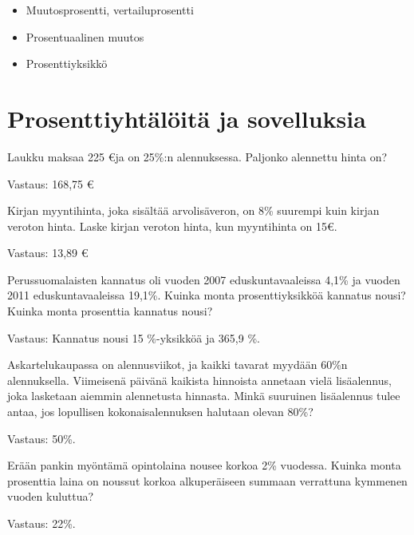 \begin{itemize}
	\item Muutosprosentti, vertailuprosentti
	\item Prosentuaalinen muutos
	\item Prosenttiyksikkö
\end{itemize}

\chapter{Prosenttiyhtälöitä ja sovelluksia}

\begin{tehtava}
Laukku maksaa 225 \euro ja on 25\%:n alennuksessa. Paljonko alennettu hinta on?
\begin{vastaus}
Vastaus: 168,75 \euro
\end{vastaus}
\end{tehtava}

\begin{tehtava}
Kirjan myyntihinta, joka sisältää arvolisäveron, on 8\% suurempi kuin kirjan veroton hinta. Laske kirjan veroton hinta, kun myyntihinta on 15\euro.
\begin{vastaus}
Vastaus: 13,89 \euro
\end{vastaus}
\end{tehtava}

\begin{tehtava}
Perussuomalaisten kannatus oli vuoden 2007 eduskuntavaaleissa 4,1\% ja vuoden 2011 eduskuntavaaleissa 19,1\%. Kuinka monta prosenttiyksikköä kannatus nousi? Kuinka monta prosenttia kannatus nousi?
\begin{vastaus}
Vastaus: Kannatus nousi 15 \%-yksikköä ja 365,9 \%.
\end{vastaus}
\end{tehtava}

\begin{tehtava}
Askartelukaupassa on alennusviikot, ja kaikki tavarat myydään 60\%n alennuksella. Viimeisenä päivänä kaikista hinnoista annetaan vielä lisäalennus, joka lasketaan aiemmin alennetusta hinnasta. Minkä suuruinen lisäalennus tulee antaa, jos lopullisen kokonaisalennuksen halutaan olevan 80\%?
\begin{vastaus}
Vastaus: 50\%.
\end{vastaus}
\end{tehtava}

\begin{tehtava}
Erään pankin myöntämä opintolaina nousee korkoa 2\% vuodessa. Kuinka monta prosenttia laina on noussut korkoa alkuperäiseen summaan verrattuna kymmenen vuoden kuluttua?
\begin{vastaus}
Vastaus: 22\%.
\end{vastaus}
\end{tehtava}


